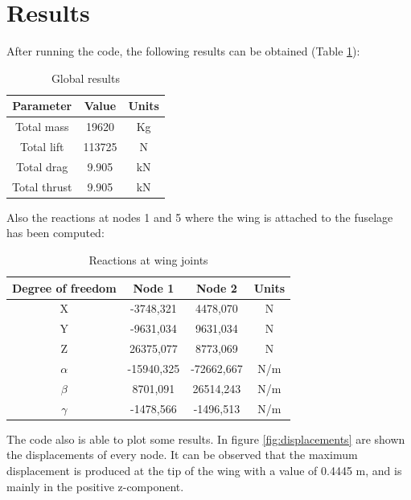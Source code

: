 \newpage

\section{Results}

After running the code, the following results can be obtained (Table \ref{tab:nominal}):

\begin{table}[h]
\centering
\begin{tabular}{ccc}
\hline
\textbf{Parameter} & \textbf{Value} & \textbf{Units} \\ \hline
Total mass	&  19620 	& Kg	\\ \hline
Total lift	&  113725 	& N	\\ \hline
Total drag	&  9.905 	& kN	\\ \hline
Total thrust	&  9.905 	& kN	\\ \hline
\end{tabular}
\caption{Global results}
\label{tab:nominal}
\end{table}

Also the reactions at nodes 1 and 5 where the wing is attached to the fuselage
has been computed:

\begin{table}[h]
\centering
\begin{tabular}{cccc}
\hline
\textbf{Degree of freedom} & \textbf{Node 1} & \textbf{Node 2} & \textbf{Units} \\ \hline
X	  	& -3748,321	& 4478,070	& N 	\\ \hline
Y	  	& -9631,034	& 9631,034	& N 	\\ \hline
Z	  	& 26375,077	& 8773,069	& N 	\\ \hline
$\alpha$   	& -15940,325	& -72662,667	& N/m 	\\ \hline
$\beta$	   	& 8701,091	& 26514,243	& N/m 	\\ \hline
$\gamma$   	& -1478,566	& -1496,513	& N/m 	\\ \hline
\end{tabular}
\caption{Reactions at wing joints}
\label{tab:reactions}
\end{table}

The code also is able to plot some results. In figure \ref{fig:displacements}
are shown the displacements of every node. It can be observed that the maximum
displacement is produced at the tip of the wing with a value of 0.4445 m, and is
mainly in the positive z-component.

